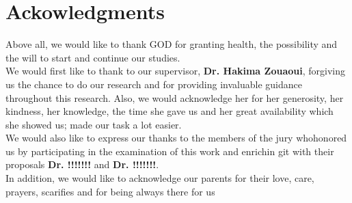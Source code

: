 \chapter*{\hfill Ackowledgments \hfill}

\vspace{3cm}

Above all, we would like to thank GOD for granting health, the possibility and the will to start and continue our studies.\\

We would first like to thank to our supervisor,  \textbf{Dr. Hakima Zouaoui}, forgiving us the chance to do our research and for providing invaluable guidance throughout this research. Also, we would acknowledge her for her generosity, her kindness, her knowledge, the time she gave us and her great availability which she showed us; made our task a lot easier.\\

We would also like to express our thanks to the members of the jury whohonored us by participating in the examination of this work and enrichin git with their proposals \textbf{Dr. !!!!!!!} and \textbf{Dr. !!!!!!!}.\\

In addition, we would like to acknowledge our parents for their love, care, prayers, scarifies and for being always there for us